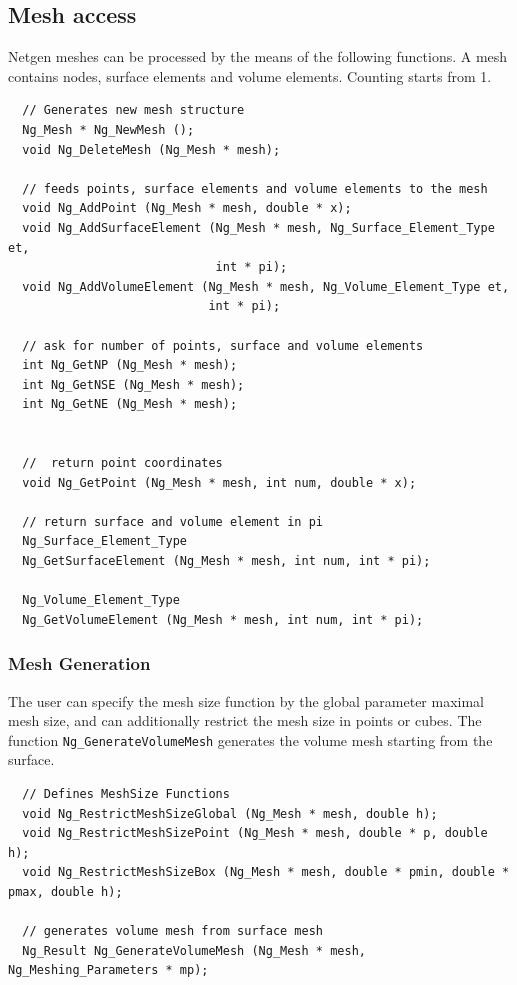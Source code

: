 \documentclass[12pt]{book}
\begin{document}
\subsection{Mesh access}
Netgen meshes can be processed by the means of the following functions.
A mesh contains nodes, surface elements and volume elements. Counting
starts from 1.

\begin{verbatim}
  // Generates new mesh structure
  Ng_Mesh * Ng_NewMesh ();
  void Ng_DeleteMesh (Ng_Mesh * mesh);
  
  // feeds points, surface elements and volume elements to the mesh
  void Ng_AddPoint (Ng_Mesh * mesh, double * x);
  void Ng_AddSurfaceElement (Ng_Mesh * mesh, Ng_Surface_Element_Type et,
                             int * pi);
  void Ng_AddVolumeElement (Ng_Mesh * mesh, Ng_Volume_Element_Type et,
                            int * pi);
  
  // ask for number of points, surface and volume elements
  int Ng_GetNP (Ng_Mesh * mesh);
  int Ng_GetNSE (Ng_Mesh * mesh);
  int Ng_GetNE (Ng_Mesh * mesh);

  
  //  return point coordinates
  void Ng_GetPoint (Ng_Mesh * mesh, int num, double * x);

  // return surface and volume element in pi
  Ng_Surface_Element_Type 
  Ng_GetSurfaceElement (Ng_Mesh * mesh, int num, int * pi);

  Ng_Volume_Element_Type
  Ng_GetVolumeElement (Ng_Mesh * mesh, int num, int * pi);
\end{verbatim}


\subsubsection{Mesh Generation}
The user can specify the mesh size function by the global parameter
maximal mesh size, and can additionally restrict the mesh size in
points or cubes. The function {\tt Ng\_GenerateVolumeMesh} generates
the volume mesh starting from the surface.

\begin{verbatim}
  // Defines MeshSize Functions
  void Ng_RestrictMeshSizeGlobal (Ng_Mesh * mesh, double h);
  void Ng_RestrictMeshSizePoint (Ng_Mesh * mesh, double * p, double h);
  void Ng_RestrictMeshSizeBox (Ng_Mesh * mesh, double * pmin, double * pmax, double h);
  
  // generates volume mesh from surface mesh
  Ng_Result Ng_GenerateVolumeMesh (Ng_Mesh * mesh, Ng_Meshing_Parameters * mp);
\end{verbatim}
\end{document}
